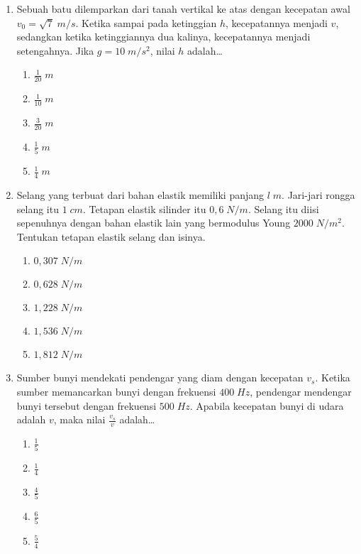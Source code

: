 \documentclass[A4,12PT, english, twocolumn]{journal}
\begin{document}
\begin{enumerate}
\item Sebuah batu dilemparkan dari tanah vertikal ke atas dengan kecepatan awal $v_0=\sqrt{7} \; m/s$. Ketika sampai pada ketinggian $h$, kecepatannya menjadi $v$, sedangkan ketika ketinggiannya dua kalinya, kecepatannya menjadi
setengahnya. Jika $g=10 \; m/s^2$, nilai $h$ adalah\dots
    \begin{enumerate}
        \item $\frac{1}{20} \; m$
        \item $\frac{1}{10} \; m$
        \item $\frac{3}{20} \; m$
        \item $\frac{1}{5} \; m$
        \item $\frac{1}{4} \; m$
    \end{enumerate}
    
\item Selang yang terbuat dari bahan elastik memiliki panjang $l \; m$. Jari-jari rongga selang itu $1 \; cm$. Tetapan elastik silinder itu $0,6 \; N/m$. Selang itu diisi sepenuhnya dengan bahan elastik lain yang bermodulus Young $2000 \; N/m^2$. Tentukan tetapan elastik selang dan isinya.
    \begin{enumerate}
        \item $0,307 \; N/m$
        \item $0,628 \; N/m$
        \item $1,228 \; N/m$
        \item $1,536 \; N/m$
        \item $1,812 \; N/m$
    \end{enumerate}

\item Sumber bunyi mendekati pendengar yang diam dengan kecepatan $v_s$. Ketika sumber memancarkan bunyi dengan
frekuensi $400 \; Hz$, pendengar mendengar bunyi tersebut dengan frekuensi $500 \; Hz$. Apabila kecepatan bunyi di udara adalah $v$, maka nilai $\frac{v_s}{v}$ adalah\dots
    \begin{enumerate}
        \item $\frac{1}{5}$
        \item $\frac{1}{4}$
        \item $\frac{4}{5}$
        \item $\frac{6}{5}$
        \item $\frac{5}{4}$
    \end{enumerate}


\end{enumerate}
\end{document}
